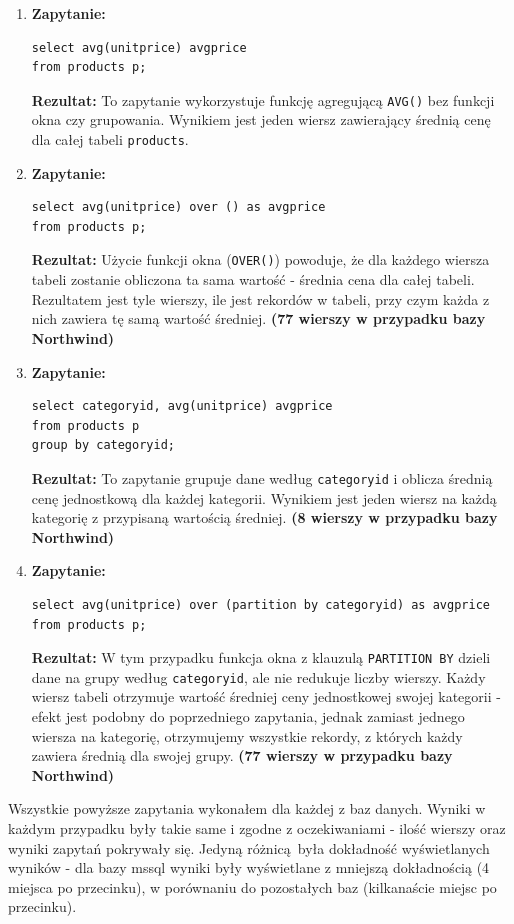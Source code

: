 \documentclass{article}
\begin{document}
\begin{enumerate}
  \item \textbf{Zapytanie:}
  \begin{verbatim}
select avg(unitprice) avgprice
from products p;
  \end{verbatim}
  \textbf{Rezultat:}  
  To zapytanie wykorzystuje funkcję agregującą \texttt{AVG()} bez funkcji okna czy grupowania. Wynikiem jest jeden wiersz zawierający średnią cenę dla całej tabeli \texttt{products}.

  \item \textbf{Zapytanie:}
  \begin{verbatim}
select avg(unitprice) over () as avgprice
from products p;
  \end{verbatim}
  \textbf{Rezultat:}  
  Użycie funkcji okna (\texttt{OVER()}) powoduje, że dla każdego wiersza tabeli zostanie obliczona ta sama wartość - średnia cena dla całej tabeli. Rezultatem jest tyle wierszy, ile jest rekordów w tabeli, przy czym każda z nich zawiera tę samą wartość średniej.   \textbf{(77 wierszy w przypadku bazy Northwind)}

  \item \textbf{Zapytanie:}
  \begin{verbatim}
select categoryid, avg(unitprice) avgprice
from products p
group by categoryid;
  \end{verbatim}
  \textbf{Rezultat:}  
  To zapytanie grupuje dane według \texttt{categoryid} i oblicza średnią cenę jednostkową dla każdej kategorii. Wynikiem jest jeden wiersz na każdą kategorię z przypisaną wartością średniej. \textbf{(8 wierszy w przypadku bazy Northwind)}

  \item \textbf{Zapytanie:}
  \begin{verbatim}
select avg(unitprice) over (partition by categoryid) as avgprice
from products p;
  \end{verbatim}
  \textbf{Rezultat:}  
  W tym przypadku funkcja okna z klauzulą \texttt{PARTITION BY} dzieli dane na grupy według \texttt{categoryid}, ale nie redukuje liczby wierszy. Każdy wiersz tabeli otrzymuje wartość średniej ceny jednostkowej swojej kategorii - efekt jest podobny do poprzedniego zapytania, jednak zamiast jednego wiersza na kategorię, otrzymujemy wszystkie rekordy, z których każdy zawiera średnią dla swojej grupy. \textbf{(77 wierszy w przypadku bazy Northwind)}
\end{enumerate}

Wszystkie powyższe zapytania wykonałem dla każdej z baz danych. Wyniki w każdym przypadku były takie same i zgodne z oczekiwaniami - ilość wierszy oraz wyniki zapytań pokrywały się.
Jedyną różnicą była dokładność wyświetlanych wyników - dla bazy mssql wyniki były wyświetlane z mniejszą dokładnością (4 miejsca po przecinku), w porównaniu do pozostałych baz (kilkanaście miejsc po przecinku).
\end{document}
